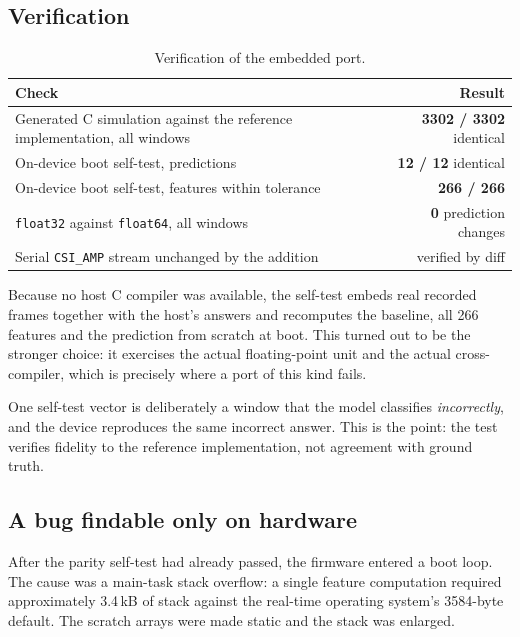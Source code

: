 \documentclass[11pt,a4paper]{article}
\newcommand{\code}[1]{\texttt{\small #1}}
\begin{document}
\subsection{Verification}

\begin{table}[H]
\centering
\caption{Verification of the embedded port.}
\begin{tabularx}{\linewidth}{@{}Xr@{}}
\toprule
\textbf{Check} & \textbf{Result} \\
\midrule
Generated C simulation against the reference implementation, all windows & \textbf{3302 / 3302} identical \\
On-device boot self-test, predictions & \textbf{12 / 12} identical \\
On-device boot self-test, features within tolerance & \textbf{266 / 266} \\
\code{float32} against \code{float64}, all windows & \textbf{0} prediction changes \\
Serial \code{CSI\_AMP} stream unchanged by the addition & verified by diff \\
\bottomrule
\end{tabularx}
\end{table}

\noindent
Because no host C compiler was available, the self-test embeds real recorded
frames together with the host's answers and recomputes the baseline, all 266
features and the prediction from scratch at boot. This turned out to be the
stronger choice: it exercises the actual floating-point unit and the actual
cross-compiler, which is precisely where a port of this kind fails.

One self-test vector is deliberately a window that the model classifies
\emph{incorrectly}, and the device reproduces the same incorrect answer. This is
the point: the test verifies fidelity to the reference implementation, not
agreement with ground truth.

\subsection{A bug findable only on hardware}

After the parity self-test had already passed, the firmware entered a boot
loop. The cause was a main-task stack overflow: a single feature computation
required approximately 3.4\,kB of stack against the real-time operating
system's 3584-byte default. The scratch arrays were made static and the stack
was enlarged.
\end{document}
